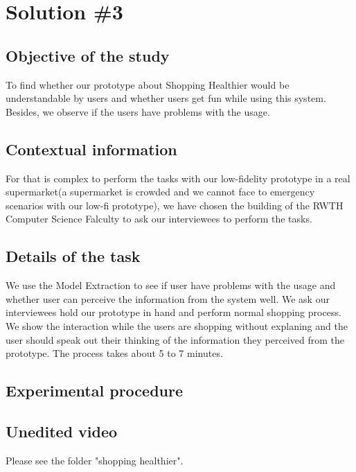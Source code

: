 \section{Solution \#3}

\subsection{Objective of the study}
To find whether our prototype about Shopping Healthier would be understandable by users and whether users get fun while using this system. Besides, we observe if the users have problems with the usage.

\subsection{Contextual information}
For that is complex to perform the tasks with our low-fidelity prototype in a real supermarket(a supermarket is crowded and we cannot face to emergency scenarios with our low-fi prototype), we have chosen the building of the RWTH Computer Science Falculty to ask our interviewees to perform the tasks.

\subsection{Details of the task}
We use the Model Extraction to see if user have problems with the usage and whether user can  perceive the information from the system well. We ask our interviewees hold our prototype in hand and perform normal shopping process. We show the interaction while the users are shopping without explaning and the user should speak out their thinking of the information they perceived from the prototype. The process takes about 5 to 7 minutes.

\subsection{Experimental procedure}


\subsection{Unedited video}
Please see the folder "shopping healthier".



